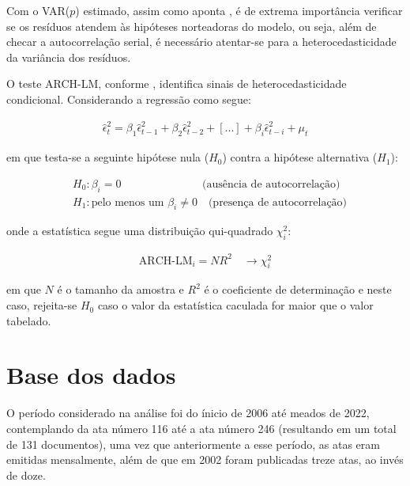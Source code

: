
Com o VAR($p$) estimado, assim como aponta , é de extrema importância verificar se os resíduos atendem às hipóteses norteadoras do modelo, ou seja, além de checar a autocorrelação serial, é necessário atentar-se para a heterocedasticidade da variância dos resíduos.

O teste ARCH-LM, conforme , identifica sinais de heterocedasticidade condicional. Considerando a regressão como segue:

\begin{ceqn}
\begin{align} \label{eq:arch}
\hat{\epsilon}_{t}^2 = \beta_{1} \hat{\epsilon}_{t-1}^2 + \beta_{2} \hat{\epsilon}_{t-2}^2 + [...] + \beta_{i} \hat{\epsilon}_{t-i}^2 + \mu_{t}
\end{align}
\end{ceqn} em que testa-se a seguinte hipótese nula ($H_{0}$) contra a hipótese alternativa ($H_{1}$):

\begin{ceqn}
\begin{align} \label{eq:hip_arch}
&H_{0}: \beta_{i} = 0 \qquad \qquad \qquad \quad \text{ (ausência de autocorrelação)} \\
&H_{1}: \text{pelo menos um } \beta_{i} \neq 0 \quad \text{(presença de autocorrelação)}
\end{align}
\end{ceqn} onde a estatística segue uma distribuição qui-quadrado $\chi_{i}^2$:

\begin{ceqn}
\begin{align} \label{eq:estat_arch}
\text{ARCH-LM}_{i} = N R^2 \quad \rightarrow \chi_{i}^2
\end{align}
\end{ceqn} em que $N$ é o tamanho da amostra e $R^2$ é o coeficiente de determinação e neste caso, rejeita-se $H_{0}$ caso o valor da estatística caculada for maior que o valor tabelado.

\section{Base dos dados}

O período considerado na análise foi do ínicio de 2006 até meados de 2022, contemplando da ata número 116 até a ata número 246 (resultando em um total de 131 documentos), uma vez que anteriormente a esse período, as atas eram emitidas mensalmente, além de que em 2002 foram publicadas treze atas, ao invés de doze.


